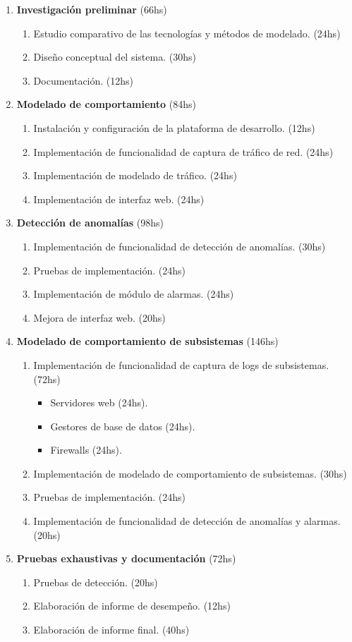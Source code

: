 \begin{enumerate}
	\setlength{\itemsep}{0pt}
	\setlength{\parskip}{0pt}
	\item \textbf{Investigación preliminar} (66hs)
	\begin{enumerate}
		\item Estudio comparativo de las tecnologías y métodos de modelado. (24hs)
		\item Diseño conceptual del sistema. (30hs)
		\item Documentación. (12hs)
	\end{enumerate}
	\item \textbf{Modelado de comportamiento} (84hs)
	\begin{enumerate}
		\item Instalación y configuración de la plataforma de desarrollo. (12hs)
		\item Implementación de funcionalidad de captura de tráfico de red. (24hs)
		\item Implementación de modelado de tráfico. (24hs)
		\item Implementación de interfaz web. (24hs)
	\end{enumerate}
	\item \textbf{Detección de anomalías} (98hs)
	\begin{enumerate}
		\item Implementación de funcionalidad de detección de anomalías. (30hs)
		\item Pruebas de implementación. (24hs)
		\item Implementación de módulo de alarmas. (24hs)
		\item Mejora de interfaz web. (20hs)
	\end{enumerate}
	\newpage
	\item \textbf{Modelado de comportamiento de subsistemas} (146hs)
	\begin{enumerate}
		\item Implementación de funcionalidad de captura de logs de subsistemas. (72hs)
		\begin{itemize}
			\item Servidores web (24hs).
			\item Gestores de base de datos (24hs).
			\item Firewalls (24hs).
		\end{itemize}
		\item Implementación de modelado de comportamiento de subsistemas. (30hs)
		\item Pruebas de implementación. (24hs)
		\item Implementación de funcionalidad de detección de anomalías y alarmas. (20hs)
	\end{enumerate}
	\item \textbf{Pruebas exhaustivas y documentación} (72hs)
	\begin{enumerate}
		\item Pruebas de detección. (20hs)
		\item Elaboración de informe de desempeño. (12hs)
		\item Elaboración de informe final. (40hs)
	\end{enumerate}
\end{enumerate}

